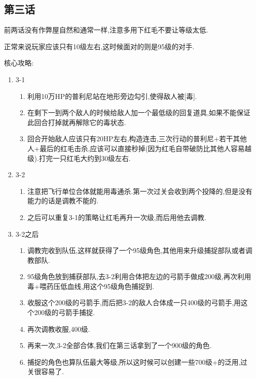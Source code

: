 	\subsection{第三话}

	前两话没有作弊屋自然和通常一样,注意多用下红毛不要让等级太低.

	正常来说玩家应该只有10级左右,这时候面对的则是95级的对手.

	核心攻略:

	\begin{enumerate}
		\item{3-1}
			\begin{enumerate}
			\item 利用10万HP的普利尼站在地形旁边勾引,使得敌人被[毒].

			\item 在剩下一到两个敌人的时候给敌人加一个最低级的回复道具,如果不能保证此回合打掉就再解除它的毒状态.

			\item 回合开始敌人应该只有20HP左右,构造连击,三次行动的普利尼+若干其他人+最后的红毛击杀,应该可以直接秒掉(因为红毛自带破防比其他人容易越级).打完一只红毛大约到30级左右.
			\end{enumerate}

		\item{3-2}
			\begin{enumerate}
				\item 注意把飞行单位合体就能用毒通杀.第一次过关会收到两个投降的,但是没有能力的话是调教不能的.

				\item 之后可以重复3-1的策略让红毛再升一次级,而后用他去调教.

			\end{enumerate}
		
		\item{3-2之后}
			\begin{enumerate}

				\item 调教完收到队伍,这样就获得了一个95级角色,其他用来升级捕捉部队或者调教部队.

				\item 95级角色放到捕获部队,去3-2利用合体把左边的弓箭手做成200级,再次利用毒+喂药压低血线,用这个95级角色捕捉到.

				\item 收服这个200级的弓箭手,而后把3-2的敌人合体成一只400级的弓箭手,用这个200级的弓箭手捕捉.

				\item 再次调教收服,400级.

				\item 再来一次,3-2全部合体,我们在第三话拿到了一个900级的角色.

				\item 捕捉的角色也算队伍最大等级,所以这时候可以创建一些700级+的泛用,过关很容易了.

			\end{enumerate}				
	

		\end{enumerate}
	
